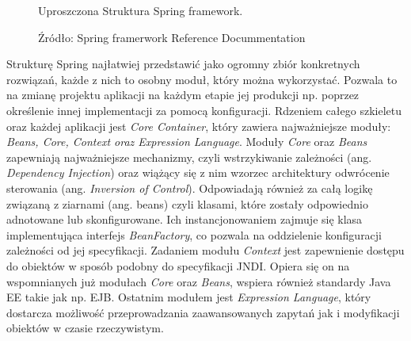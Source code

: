 \begin{figure}[h!]
	\caption{Uproszczona Struktura Spring framework. }
	    \caption*{Źródło: Spring framerwork Reference Docummentation}
	\centering
	\label{fig:springStructure}
\end{figure}


Strukturę Spring najłatwiej przedstawić jako ogromny zbiór konkretnych rozwiązań, każde z nich to osobny moduł, który można wykorzystać\cite{SPR01}. Pozwala to na zmianę projektu aplikacji na każdym etapie jej produkcji np. poprzez określenie innej implementacji za pomocą konfiguracji. Rdzeniem całego szkieletu oraz każdej aplikacji jest \textit{Core Container}, który zawiera najważniejsze moduły: \textit{Beans, Core, Context oraz Expression Language}. Moduły \textit{Core} oraz \textit{Beans} zapewniają najważniejsze mechanizmy, czyli wstrzykiwanie zależności (ang. \textit{Dependency Injection}) oraz wiążący się z nim wzorzec architektury odwrócenie sterowania (ang. \textit{Inversion of Control}). Odpowiadają również za całą logikę związaną z ziarnami (ang. beans) czyli klasami, które zostały odpowiednio adnotowane lub skonfigurowane. Ich instancjonowaniem zajmuje się klasa implementująca interfejs \textit{BeanFactory}, co pozwala na oddzielenie konfiguracji zależności od jej specyfikacji. Zadaniem modułu \textit{Context} jest zapewnienie dostępu do obiektów w sposób podobny do specyfikacji JNDI. Opiera się on na wspomnianych już modułach \textit{Core} oraz \textit{Beans}, wspiera również standardy Java EE takie jak np. EJB. Ostatnim modułem jest \textit{Expression Language}, który dostarcza możliwość przeprowadzania zaawansowanych zapytań jak i modyfikacji obiektów w czasie rzeczywistym. 


